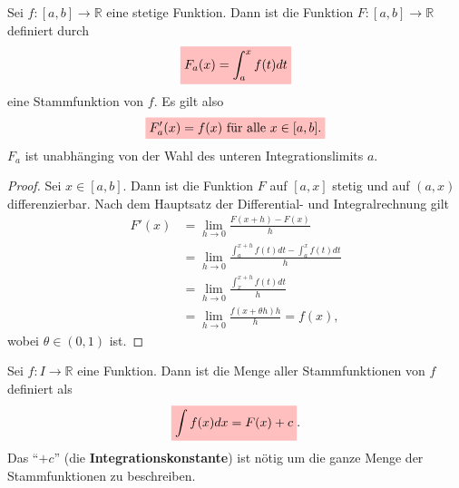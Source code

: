 \documentclass[12pt]{article}
\newcommand{\R}{\mathbb{R}} %
\newenvironment{definition}[2][Definition]{\begin{trivlist}
        \item[\hskip \labelsep {\bfseries #1}\hskip \labelsep {\bfseries #2.}]}{\flushright{$\square$}\end{trivlist}}
\newenvironment{lemma}[2][Theorem]{\begin{trivlist}
        \item[\hskip \labelsep {\bfseries #1}\hskip \labelsep {\bfseries #2.}]}{\flushright{$\square$}\end{trivlist}}
\begin{document}
\begin{lemma}{[Hauptsatz der Differential- und Integralrechnung]}
    Sei $f: [a,b] \to \R$ eine stetige Funktion. Dann ist die Funktion $F: [a,b] \to \R$ definiert durch
    \begin{align}
        \colorbox{pink}{$\displaystyle F_a(x)=\int_{a}^{x}f(t)dt$}
    \end{align}
    eine Stammfunktion von $f$. Es gilt also
    \begin{align}
        \colorbox{pink}{$\displaystyle F_a'(x)=f(x) \text{ für alle } x \in [a,b].$}
    \end{align}
    $F_a$ ist unabhänging von der Wahl des unteren Integrationslimits $a$.

    \begin{proof}
        Sei $x \in [a,b]$. Dann ist die Funktion $F$ auf $[a,x]$ stetig und auf $(a,x)$ differenzierbar. Nach dem Hauptsatz der Differential- und Integralrechnung gilt
        \begin{align*}
            F'(x) & =\lim_{h \to 0}\frac{F(x+h)-F(x)}{h}                             \\
                  & =\lim_{h \to 0}\frac{\int_{a}^{x+h}f(t)dt-\int_{a}^{x}f(t)dt}{h} \\
                  & =\lim_{h \to 0}\frac{\int_{x}^{x+h}f(t)dt}{h}                    \\
                  & =\lim_{h \to 0}\frac{f(x+\theta h)h}{h}=f(x),
        \end{align*}
        wobei $\theta \in (0,1)$ ist.
    \end{proof}
\end{lemma}

\begin{definition}{[Unbestimmtes Integral]}
    Sei $f: I \to \R$ eine Funktion. Dann ist die Menge aller Stammfunktionen von $f$ definiert als
    \begin{align}
        \colorbox{pink}{\mathstrut$\displaystyle\int f(x)dx = F(x)+c$}.
    \end{align}
    Das ``$+c$'' (die \textbf{Integrationskonstante}) ist nötig um die ganze Menge der Stammfunktionen zu beschreiben.
\end{definition}
\end{document}
